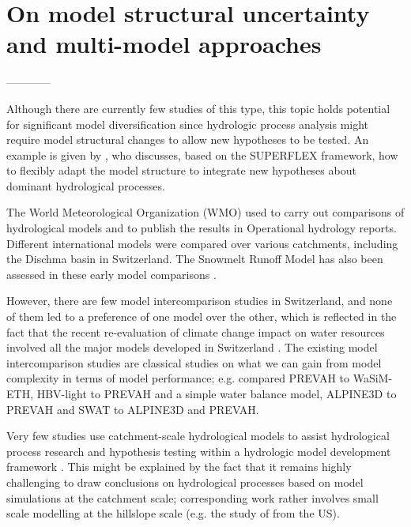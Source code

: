 \documentclass[10pt,a4paper]{article}
\begin{document}
\section{On model structural uncertainty and multi-model approaches}
\label{sec:multi-model}


------------

Although there are currently few studies of this type, this topic holds potential for significant model diversification since hydrologic process analysis might require model structural changes to allow new hypotheses to be tested. An example is given by \citet{DalMolin2020}, who discusses, based on the SUPERFLEX framework, how to flexibly adapt the model structure to integrate new hypotheses about dominant hydrological processes.

The World Meteorological Organization (WMO) used to carry out comparisons of hydrological models and to publish the results in Operational hydrology reports. Different international models were compared over various catchments, including the Dischma basin in Switzerland. The Snowmelt Runoff Model \citep[SRM,][see supplementary material]{martinec1975} has also been assessed in these early model comparisons \citep{WMO1986, WMO1992}.

However, there are few model intercomparison studies in Switzerland, and none of them led to a preference of one model over the other, which is reflected in the fact that the recent re-evaluation of climate change impact on water resources involved all the major models developed in Switzerland  \citep{bafu2021}. The existing model intercomparison studies are classical studies on what we can gain from model complexity in terms of model performance; e.g. \citet{Gurtz2003} compared PREVAH to WaSiM-ETH, \citet{Orth2015} HBV-light to PREVAH and a simple water balance model, \citet{Kobierska2013} ALPINE3D to PREVAH and \citet{Andrianaki2019} SWAT to ALPINE3D and PREVAH.

Very few studies use catchment-scale hydrological models to assist hydrological process research and hypothesis testing within a hydrologic model development framework \citep{clarkOpinion2016}. This might be explained by the fact that it remains highly challenging to draw conclusions on hydrological processes based on model simulations at the catchment scale; corresponding work rather involves small scale modelling at the hillslope scale (e.g. the study of \citealt{Heuvel2018} from the US).  

\end{document}
